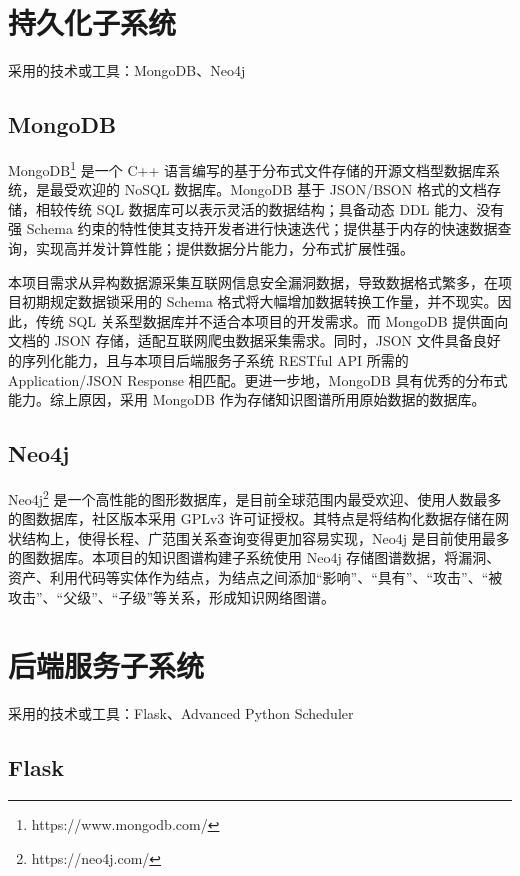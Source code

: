 \documentclass[a4paper,AutoFakeBold,oneside,12pt]{book}
\begin{document}
\section{持久化子系统}

采用的技术或工具：MongoDB、Neo4j

\subsection{MongoDB}

MongoDB\footnote{https://www.mongodb.com/} 是一个 C++ 语言编写的基于分布式文件存储的开源文档型数据库系统，是最受欢迎的 NoSQL 数据库。MongoDB 基于 JSON/BSON 格式的文档存储，相较传统 SQL 数据库可以表示灵活的数据结构；具备动态 DDL 能力、没有强 Schema 约束的特性使其支持开发者进行快速迭代；提供基于内存的快速数据查询，实现高并发计算性能；提供数据分片能力，分布式扩展性强。

本项目需求从异构数据源采集互联网信息安全漏洞数据，导致数据格式繁多，在项目初期规定数据锁采用的 Schema 格式将大幅增加数据转换工作量，并不现实。因此，传统 SQL 关系型数据库并不适合本项目的开发需求。而 MongoDB 提供面向文档的 JSON 存储，适配互联网爬虫数据采集需求。同时，JSON 文件具备良好的序列化能力，且与本项目后端服务子系统 RESTful API 所需的 Application/JSON Response 相匹配。更进一步地，MongoDB 具有优秀的分布式能力。综上原因，采用 MongoDB 作为存储知识图谱所用原始数据的数据库。

\subsection{Neo4j}

Neo4j\footnote{https://neo4j.com/} 是一个高性能的图形数据库，是目前全球范围内最受欢迎、使用人数最多的图数据库，社区版本采用 GPLv3 许可证授权。其特点是将结构化数据存储在网状结构上，使得长程、广范围关系查询变得更加容易实现，Neo4j 是目前使用最多的图数据库。本项目的知识图谱构建子系统使用 Neo4j 存储图谱数据，将漏洞、资产、利用代码等实体作为结点，为结点之间添加“影响”、“具有”、“攻击”、“被攻击”、“父级”、“子级”等关系，形成知识网络图谱。

\section{后端服务子系统}

采用的技术或工具：Flask、Advanced Python Scheduler

\subsection{Flask}
\end{document}
